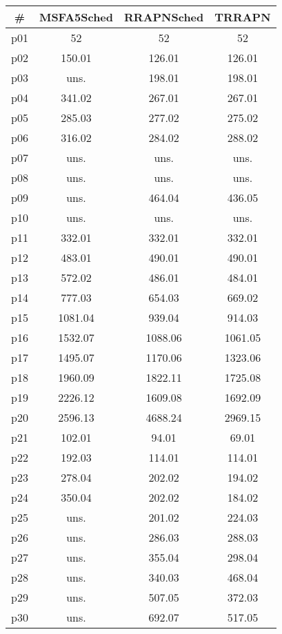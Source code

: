 \begin{tabular}{c||c|c|c}
\textbf{\#} & \textbf{MSFA5Sched} & \textbf{RRAPNSched} & \textbf{TRRAPN}\\
\hline
\hline
p01 & 52 & 52 & 52\\
p02 & 150.01 & 126.01 & 126.01\\
p03 & uns. & 198.01 & 198.01\\
p04 & 341.02 & 267.01 & 267.01\\
p05 & 285.03 & 277.02 & 275.02\\
p06 & 316.02 & 284.02 & 288.02\\
p07 & uns. & uns. & uns.\\
p08 & uns. & uns. & uns.\\
p09 & uns. & 464.04 & 436.05\\
p10 & uns. & uns. & uns.\\
p11 & 332.01 & 332.01 & 332.01\\
p12 & 483.01 & 490.01 & 490.01\\
p13 & 572.02 & 486.01 & 484.01\\
p14 & 777.03 & 654.03 & 669.02\\
p15 & 1081.04 & 939.04 & 914.03\\
p16 & 1532.07 & 1088.06 & 1061.05\\
p17 & 1495.07 & 1170.06 & 1323.06\\
p18 & 1960.09 & 1822.11 & 1725.08\\
p19 & 2226.12 & 1609.08 & 1692.09\\
p20 & 2596.13 & 4688.24 & 2969.15\\
p21 & 102.01 & 94.01 & 69.01\\
p22 & 192.03 & 114.01 & 114.01\\
p23 & 278.04 & 202.02 & 194.02\\
p24 & 350.04 & 202.02 & 184.02\\
p25 & uns. & 201.02 & 224.03\\
p26 & uns. & 286.03 & 288.03\\
p27 & uns. & 355.04 & 298.04\\
p28 & uns. & 340.03 & 468.04\\
p29 & uns. & 507.05 & 372.03\\
p30 & uns. & 692.07 & 517.05\\
\end{tabular}

